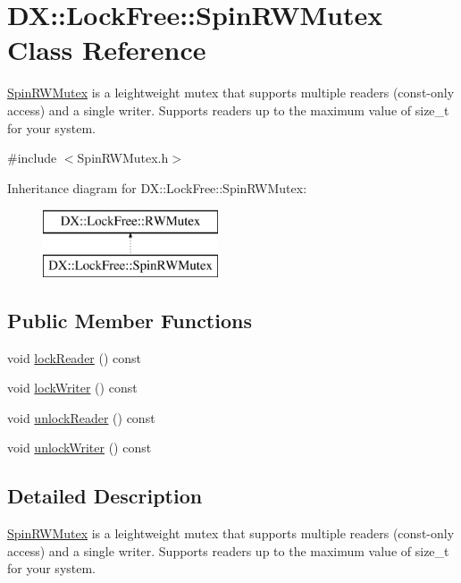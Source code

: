 \hypertarget{class_d_x_1_1_lock_free_1_1_spin_r_w_mutex}{\section{D\-X\-:\-:Lock\-Free\-:\-:Spin\-R\-W\-Mutex Class Reference}
\label{class_d_x_1_1_lock_free_1_1_spin_r_w_mutex}
}


\hyperlink{class_d_x_1_1_lock_free_1_1_spin_r_w_mutex}{Spin\-R\-W\-Mutex} is a leightweight mutex that supports multiple readers (const-\/only access) and a single writer. Supports readers up to the maximum value of size\-\_\-t for your system.  




{\ttfamily \#include $<$Spin\-R\-W\-Mutex.\-h$>$}

Inheritance diagram for D\-X\-:\-:Lock\-Free\-:\-:Spin\-R\-W\-Mutex\-:\begin{figure}[H]
\begin{center}
\leavevmode
\includegraphics[height=2.000000cm]{class_d_x_1_1_lock_free_1_1_spin_r_w_mutex}
\end{center}
\end{figure}
\subsection*{Public Member Functions}
\begin{DoxyCompactItemize}
\item 
void \hyperlink{class_d_x_1_1_lock_free_1_1_spin_r_w_mutex_a71e9aef3a5e51ca1f74b765e3b123261}{lock\-Reader} () const 
\item 
void \hyperlink{class_d_x_1_1_lock_free_1_1_spin_r_w_mutex_a183780cdd01f30fef36febe8e7a7f9b7}{lock\-Writer} () const 
\item 
void \hyperlink{class_d_x_1_1_lock_free_1_1_spin_r_w_mutex_a64d2de6d900ba6eaeea1a0a76ac4ff5d}{unlock\-Reader} () const 
\item 
void \hyperlink{class_d_x_1_1_lock_free_1_1_spin_r_w_mutex_af20a514e5cc56ac5fbf6ab7759fafe1c}{unlock\-Writer} () const 
\end{DoxyCompactItemize}


\subsection{Detailed Description}
\hyperlink{class_d_x_1_1_lock_free_1_1_spin_r_w_mutex}{Spin\-R\-W\-Mutex} is a leightweight mutex that supports multiple readers (const-\/only access) and a single writer. Supports readers up to the maximum value of size\-\_\-t for your system. 

